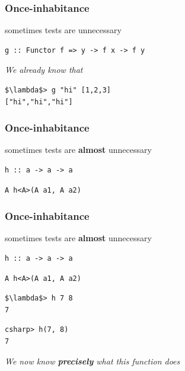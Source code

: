 \begin{frame}[fragile]
\frametitle{Once-inhabitance}
\begin{block}{sometimes tests are unnecessary}
\begin{lstlisting}[style=haskell]
g :: Functor f => y -> f x -> f y
\end{lstlisting}
\end{block}
\emph{We already know that}
\begin{lstlisting}[style=haskell,mathescape]
$\lambda$> g "hi" [1,2,3]
["hi","hi","hi"]
\end{lstlisting}
\end{frame}

\begin{frame}[fragile]
\frametitle{Once-inhabitance}
\begin{block}{sometimes tests are \textbf{almost} unnecessary}
\begin{lstlisting}[style=haskell]
h :: a -> a -> a
\end{lstlisting}
\begin{lstlisting}[style=csharp]
A h<A>(A a1, A a2)
\end{lstlisting}
\end{block}
\end{frame}

\begin{frame}[fragile]
\frametitle{Once-inhabitance}
\begin{block}{sometimes tests are \textbf{almost} unnecessary}
\begin{lstlisting}[style=haskell]
h :: a -> a -> a
\end{lstlisting}
\begin{lstlisting}[style=csharp]
A h<A>(A a1, A a2)
\end{lstlisting}

\end{block}
\begin{lstlisting}[style=haskell,mathescape]
$\lambda$> h 7 8
7
\end{lstlisting}
\begin{lstlisting}[style=csharp]
csharp> h(7, 8)
7
\end{lstlisting}
\emph{We now know \textbf{precisely} what this function does}
\end{frame}

